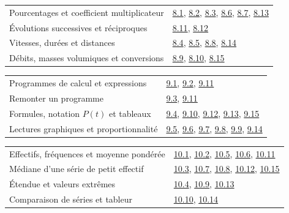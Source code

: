 \begin{tabularx}{\linewidth}{@{}Yl@{}}\toprule
Pourcentages et coefficient multiplicateur & \hyperref[exo-8-1]{8.1}, \hyperref[exo-8-2]{8.2}, \hyperref[exo-8-3]{8.3}, \hyperref[exo-8-6]{8.6}, \hyperref[exo-8-7]{8.7}, \hyperref[exo-8-13]{8.13}\\[2mm]
Évolutions successives et réciproques & \hyperref[exo-8-11]{8.11}, \hyperref[exo-8-12]{8.12}\\[2mm]
Vitesses, durées et distances & \hyperref[exo-8-4]{8.4}, \hyperref[exo-8-5]{8.5}, \hyperref[exo-8-8]{8.8}, \hyperref[exo-8-14]{8.14}\\[2mm]
Débits, masses volumiques et conversions & \hyperref[exo-8-9]{8.9}, \hyperref[exo-8-10]{8.10}, \hyperref[exo-8-15]{8.15}\\[2mm]
\bottomrule\end{tabularx}\par\vspace{4mm}
\begin{tabularx}{\linewidth}{@{}Yl@{}}\toprule
Programmes de calcul et expressions & \hyperref[exo-9-1]{9.1}, \hyperref[exo-9-2]{9.2}, \hyperref[exo-9-11]{9.11}\\[2mm]
Remonter un programme & \hyperref[exo-9-3]{9.3}, \hyperref[exo-9-11]{9.11}\\[2mm]
Formules, notation $P(t)$ et tableaux & \hyperref[exo-9-4]{9.4}, \hyperref[exo-9-10]{9.10}, \hyperref[exo-9-12]{9.12}, \hyperref[exo-9-13]{9.13}, \hyperref[exo-9-15]{9.15}\\[2mm]
Lectures graphiques et proportionnalité & \hyperref[exo-9-5]{9.5}, \hyperref[exo-9-6]{9.6}, \hyperref[exo-9-7]{9.7}, \hyperref[exo-9-8]{9.8}, \hyperref[exo-9-9]{9.9}, \hyperref[exo-9-14]{9.14}\\[2mm]
\bottomrule\end{tabularx}\par\vspace{4mm}
\clearpage
{}\fontsize{10}{13}\selectfont
{}\begin{tabularx}{\linewidth}{@{}Yl@{}}\toprule
Effectifs, fréquences et moyenne pondérée & \hyperref[exo-10-1]{10.1}, \hyperref[exo-10-2]{10.2}, \hyperref[exo-10-5]{10.5}, \hyperref[exo-10-6]{10.6}, \hyperref[exo-10-11]{10.11}\\[2mm]
Médiane d’une série de petit effectif & \hyperref[exo-10-3]{10.3}, \hyperref[exo-10-7]{10.7}, \hyperref[exo-10-8]{10.8}, \hyperref[exo-10-12]{10.12}, \hyperref[exo-10-15]{10.15}\\[2mm]
Étendue et valeurs extrêmes & \hyperref[exo-10-4]{10.4}, \hyperref[exo-10-9]{10.9}, \hyperref[exo-10-13]{10.13}\\[2mm]
Comparaison de séries et tableur & \hyperref[exo-10-10]{10.10}, \hyperref[exo-10-14]{10.14}\\[2mm]
\bottomrule\end{tabularx}\par\vspace{4mm}
